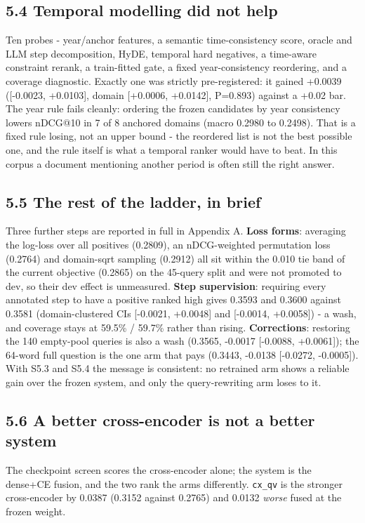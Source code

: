 \documentclass[11pt]{article}
\begin{document}
\subsection*{5.4 Temporal modelling did not help}
Ten probes - year/anchor features, a semantic time-consistency score, oracle and LLM step decomposition, HyDE, temporal hard negatives, a time-aware constraint rerank, a train-fitted gate, a fixed year-consistency reordering, and a coverage diagnostic. Exactly one was strictly pre-registered: it gained +0.0039 ([-0.0023, +0.0103], domain [+0.0006, +0.0142], P=0.893) against a +0.02 bar. The year rule fails cleanly: ordering the frozen candidates by year consistency lowers nDCG@10 in 7 of 8 anchored domains (macro 0.2980 to 0.2498). That is a fixed rule losing, not an upper bound - the reordered list is not the best possible one, and the rule itself is what a temporal ranker would have to beat. In this corpus a document mentioning another period is often still the right answer.

\subsection*{5.5 The rest of the ladder, in brief}
Three further steps are reported in full in Appendix A. \textbf{Loss forms}: averaging the log-loss over all positives (0.2809), an nDCG-weighted permutation loss (0.2764) and domain-sqrt sampling (0.2912) all sit within the 0.010 tie band of the current objective (0.2865) on the 45-query split and were not promoted to dev, so their dev effect is unmeasured. \textbf{Step supervision}: requiring every annotated step to have a positive ranked high gives 0.3593 and 0.3600 against 0.3581 (domain-clustered CIs [-0.0021, +0.0048] and [-0.0014, +0.0058]) - a wash, and coverage stays at 59.5\% / 59.7\% rather than rising. \textbf{Corrections}: restoring the 140 empty-pool queries is also a wash (0.3565, -0.0017 [-0.0088, +0.0061]); the 64-word full question is the one arm that pays (0.3443, -0.0138 [-0.0272, -0.0005]). With S5.3 and S5.4 the message is consistent: no retrained arm shows a reliable gain over the frozen system, and only the query-rewriting arm loses to it.

\subsection*{5.6 A better cross-encoder is not a better system}
The checkpoint screen scores the cross-encoder alone; the system is the dense+CE fusion, and the two rank the arms differently. \texttt{cx\_qv} is the stronger cross-encoder by 0.0387 (0.3152 against 0.2765) and 0.0132 \emph{worse} fused at the frozen weight.
\end{document}

